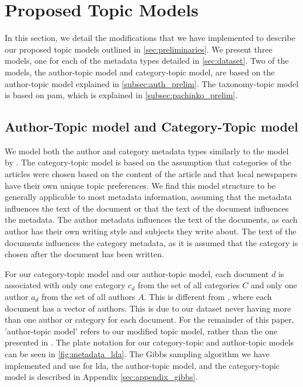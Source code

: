 \section{Proposed Topic Models}\label{sec:plate_notation}
In this section, we detail the modifications that we have implemented to describe our proposed topic models outlined in \autoref{sec:preliminaries}.
We present three models, one for each of the metadata types detailed in \autoref{sec:dataset}.
Two of the models, the author-topic model and category-topic model, are based on the author-topic model explained in \autoref{subsec:auth_prelim}.
The taxonomy-topic model is based on \gls{pam}, which is explained in \autoref{subsec:pachinko_prelim}.


\subsection{Author-Topic model and Category-Topic model}
We model both the author and category metadata types similarly to the model by \citet{author_topic_2012}.
The category-topic model is based on the assumption that categories of the articles were chosen based on the content of the article and that local newspapers have their own unique topic preferences.
We find this model structure to be generally applicable to most metadata information, assuming that the metadata influences the text of the document or that the text of the document influences the metadata.
The author metadata influences the text of the documents, as each author has their own writing style and subjects they write about.
The text of the documents influences the category metadata, as it is assumed that the category is chosen after the document has been written.

For our category-topic model and our author-topic model, each document $d$ is associated with only one category $c_d$ from the set of all categories $C$ and only one author $a_d$ from the set of all authors $A$.
This is different from \citet{author_topic_2012}, where each document has a vector of authors.
This is due to our dataset never having more than one author or category for each document.
For the remainder of this paper, 'author-topic model' refers to our modified topic model, rather than the one presented in \citet{author_topic_2012}.
The plate notation for our category-topic and author-topic models can be seen in \autoref{fig:metadata_lda}.
The Gibbs sampling algorithm we have implemented and use for \gls{lda}, the author-topic model, and the category-topic model is described in Appendix \autoref{sec:appendix_gibbs}.

